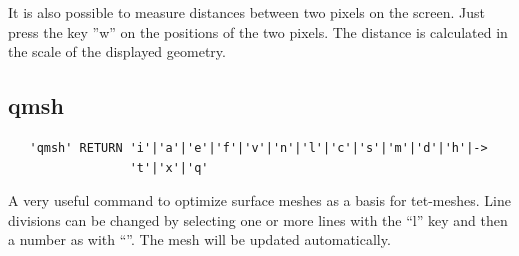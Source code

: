 \documentclass{article}
\begin{document}
It is also possible to measure distances between two pixels on the screen. Just press the key ''w'' on the positions of the two pixels. The distance is calculated in the scale of the displayed geometry.  


\subsection{\label{qmsh}qmsh}
\begin{verbatim}
   'qmsh' RETURN 'i'|'a'|'e'|'f'|'v'|'n'|'l'|'c'|'s'|'m'|'d'|'h'|->
                 't'|'x'|'q'
\end{verbatim}
A very useful command to optimize surface meshes as a basis for tet-meshes. Line divisions can be changed by selecting one or more lines with the ``l'' key and then a number as with ``''. The mesh will be updated automatically.
\end{document}
